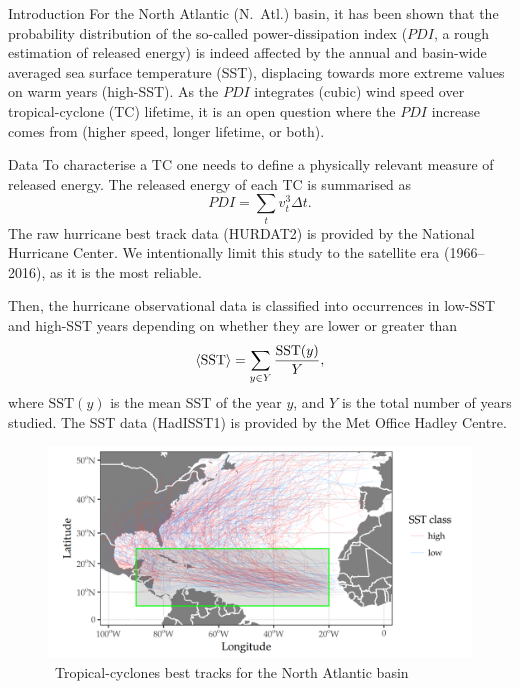 
\begin{block}{Introduction}
	\nocite{Hinkley1997}
	For the North Atlantic (N.~Atl.) basin, it has been shown \cite{Corral2010} that the probability distribution of the so-called power-dissipation index ($PDI$, a rough estimation of released energy) is indeed affected by the annual and basin-wide averaged sea surface temperature (SST), displacing towards more extreme values on warm years (high-SST).
	As the $PDI$ integrates (cubic) wind speed over tropical-cyclone (TC) lifetime, it is an open question where the $PDI$ increase comes from (higher speed, longer lifetime, or both).
\end{block}

\begin{block}{Data}
	To characterise a TC one needs to define a physically relevant measure of released energy. The released energy of each TC is summarised as
	\begin{equation}\label{eq:pdi}
		PDI = \sum_{t} v_{t}^{3} \Delta t .
	\end{equation}
	The raw hurricane best track data (HURDAT2) is provided by the National Hurricane Center. We intentionally limit this study to the satellite era (1966--2016), as it is the most reliable.

	\bigskip
	Then, the hurricane observational data is classified into occurrences in low-SST and high-SST years depending on whether they are lower or greater than
	\begin{equation}
		\ev{\text{SST}} = \sum_{y \in Y} \frac{\text{SST}(y)}{Y} ,
	\end{equation}
	where $\text{SST}(y)$ is the mean SST of the year $y$, and $Y$ is the total number of years studied. The SST data (HadISST1) is provided by the Met Office Hadley Centre.

\end{block}

\begin{block}{ }
	\begin{figure}
		\vspace*{-1.1cm}
		\includegraphics[width=0.84\linewidth]{images/natl_map.png}
		\caption{~Tropical-cyclones best tracks for the North Atlantic basin}
	\end{figure}
\end{block}

